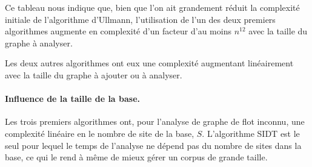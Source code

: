 Ce tableau nous indique que, bien que l'on ait grandement réduit la complexité initiale de l'algorithme d'Ullmann, l'utilisation de l'un des deux premiers algorithmes augmente en complexité d'un facteur d'au moins $n^{12}$ avec la taille du graphe à analyser.

Les deux autres algorithmes ont eux une complexité augmentant linéairement avec la taille du graphe à ajouter ou à analyser.

\paragraph{Influence de la taille de la base.}
Les trois premiers algorithmes ont, pour l'analyse de graphe de flot inconnu, une complexité linéaire en le nombre de site de la base, $S$.
L'algorithme SIDT est le seul pour lequel le temps de l'analyse ne dépend pas du nombre de sites dans la base, ce qui le rend à même de mieux gérer un corpus de grande taille.




